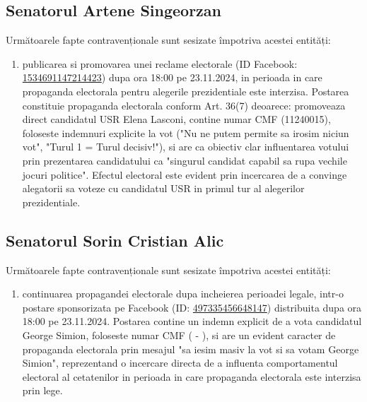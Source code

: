 \documentclass[a4paper,12pt]{article}
\begin{document}
\subsection{Senatorul Artene Singeorzan}
Următoarele fapte contravenționale sunt sesizate împotriva acestei entități:

\begin{enumerate}[leftmargin=*, label=\arabic*.)]
    \item publicarea si promovarea unei reclame electorale (ID Facebook: \href{https://www.facebook.com/ads/library/?id=1534691147214423}{1534691147214423}) dupa ora 18:00 pe 23.11.2024, in perioada in care propaganda electorala pentru alegerile prezidentiale este interzisa. Postarea constituie propaganda electorala conform Art. 36(7) deoarece: promoveaza direct candidatul USR Elena Lasconi, contine numar CMF (11240015), foloseste indemnuri explicite la vot ("Nu ne putem permite sa irosim niciun vot", "Turul 1 = Turul decisiv!"), si are ca obiectiv clar influentarea votului prin prezentarea candidatului ca "singurul candidat capabil sa rupa vechile jocuri politice". Efectul electoral este evident prin incercarea de a convinge alegatorii sa voteze cu candidatul USR in primul tur al alegerilor prezidentiale.
\end{enumerate}

\vspace{0.5cm}

\subsection{Senatorul Sorin Cristian Alic}
Următoarele fapte contravenționale sunt sesizate împotriva acestei entități:

\begin{enumerate}[leftmargin=*, label=\arabic*.)]
    \item continuarea propagandei electorale dupa incheierea perioadei legale, intr-o postare sponsorizata pe Facebook (ID: \href{https://www.facebook.com/ads/library/?id=497335456648147}{497335456648147}) distribuita dupa ora 18:00 pe 23.11.2024. Postarea contine un indemn explicit de a vota candidatul George Simion, foloseste numar CMF ( - ), si are un evident caracter de propaganda electorala prin mesajul "sa iesim masiv la vot si sa votam George Simion", reprezentand o incercare directa de a influenta comportamentul electoral al cetatenilor in perioada in care propaganda electorala este interzisa prin lege.
\end{enumerate}
\end{document}
